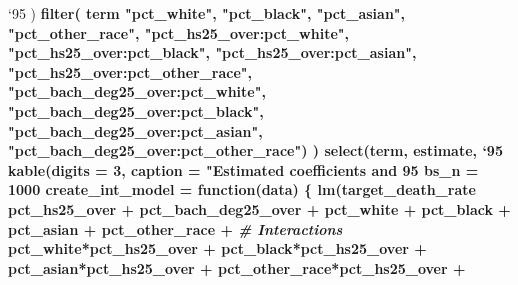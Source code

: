 \documentclass[
  11pt,
]{article}
\newenvironment{Shaded}{\begin{snugshade}}{\end{snugshade}}
\newcommand{\CommentTok}[1]{\textcolor[rgb]{0.56,0.35,0.01}{\textit{#1}}}
\newcommand{\ControlFlowTok}[1]{\textcolor[rgb]{0.13,0.29,0.53}{\textbf{#1}}}
\newcommand{\DataTypeTok}[1]{\textcolor[rgb]{0.13,0.29,0.53}{#1}}
\newcommand{\DecValTok}[1]{\textcolor[rgb]{0.00,0.00,0.81}{#1}}
\newcommand{\KeywordTok}[1]{\textcolor[rgb]{0.13,0.29,0.53}{\textbf{#1}}}
\newcommand{\NormalTok}[1]{#1}
\newcommand{\OperatorTok}[1]{\textcolor[rgb]{0.81,0.36,0.00}{\textbf{#1}}}
\newcommand{\StringTok}[1]{\textcolor[rgb]{0.31,0.60,0.02}{#1}}
\begin{document}
\begin{Shaded}
\begin{Highlighting}[]
{{{{{{{{{{{{{{{{{{{{{{{    \StringTok{`}\DataTypeTok{95%
\NormalTok{  ) }\OperatorTok{%
\StringTok{  }\KeywordTok{filter}\NormalTok{(}
\NormalTok{    term }\OperatorTok{%
                \StringTok{"pct_white"}\NormalTok{, }\StringTok{"pct_black"}\NormalTok{, }\StringTok{"pct_asian"}\NormalTok{, }\StringTok{"pct_other_race"}\NormalTok{,}
                \StringTok{"pct_hs25_over:pct_white"}\NormalTok{, }\StringTok{"pct_hs25_over:pct_black"}\NormalTok{,}
                \StringTok{"pct_hs25_over:pct_asian"}\NormalTok{, }\StringTok{"pct_hs25_over:pct_other_race"}\NormalTok{,}
                \StringTok{"pct_bach_deg25_over:pct_white"}\NormalTok{, }\StringTok{"pct_bach_deg25_over:pct_black"}\NormalTok{,}
                \StringTok{"pct_bach_deg25_over:pct_asian"}\NormalTok{, }\StringTok{"pct_bach_deg25_over:pct_other_race"}\NormalTok{)}
\NormalTok{  ) }\OperatorTok{%
\StringTok{  }\KeywordTok{select}\NormalTok{(term, estimate, }\StringTok{`}\DataTypeTok{95%
\StringTok{  }\KeywordTok{kable}\NormalTok{(}\DataTypeTok{digits =} \DecValTok{3}\NormalTok{,}
        \DataTypeTok{caption =} \StringTok{"Estimated coefficients and 95%
\NormalTok{bs_n =}\StringTok{ }\DecValTok{1000}
\NormalTok{create_int_model =}\StringTok{ }\ControlFlowTok{function}\NormalTok{(data) \{}
  \KeywordTok{lm}\NormalTok{(target_death_rate }\OperatorTok{~}\StringTok{ }\NormalTok{pct_hs25_over }\OperatorTok{+}\StringTok{ }\NormalTok{pct_bach_deg25_over }\OperatorTok{+}\StringTok{ }
\StringTok{             }\NormalTok{pct_white }\OperatorTok{+}\StringTok{ }\NormalTok{pct_black }\OperatorTok{+}\StringTok{ }\NormalTok{pct_asian }\OperatorTok{+}\StringTok{ }\NormalTok{pct_other_race }\OperatorTok{+}
\StringTok{             }\CommentTok{# Interactions}
\StringTok{             }\NormalTok{pct_white}\OperatorTok{*}\NormalTok{pct_hs25_over }\OperatorTok{+}\StringTok{ }\NormalTok{pct_black}\OperatorTok{*}\NormalTok{pct_hs25_over }\OperatorTok{+}\StringTok{ }\NormalTok{pct_asian}\OperatorTok{*}\NormalTok{pct_hs25_over }\OperatorTok{+}\StringTok{ }\NormalTok{pct_other_race}\OperatorTok{*}\NormalTok{pct_hs25_over }\OperatorTok{+}
}}}}}}}}}}}}}}}}}}}}}}}}}}}}}
\end{Highlighting}
\end{Shaded}
\end{document}
